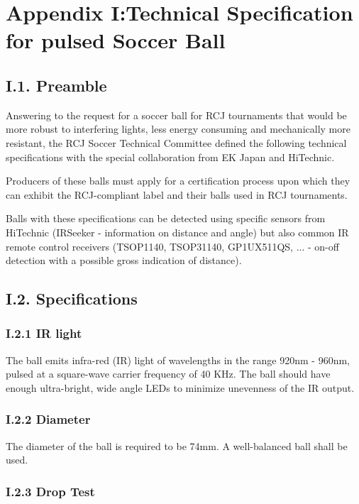 \documentclass{article}
\begin{document}
\section{Appendix I:Technical Specification for pulsed Soccer Ball\label{ref-062}}

\subsection{I.1. Preamble}

Answering to the request for a soccer ball for RCJ tournaments that would be more robust to interfering lights, less energy consuming and mechanically more resistant, the RCJ Soccer Technical Committee defined the following technical specifications with the special collaboration from EK Japan and HiTechnic.

Producers of these balls must apply for a certification process upon which they can exhibit the RCJ-compliant label and their balls used in RCJ tournaments.

Balls with these specifications can be detected using specific sensors from HiTechnic (IRSeeker - information on distance and angle) but also common IR remote control receivers (TSOP1140, TSOP31140, GP1UX511QS, ... - on-off detection with a possible gross indication of distance).

\subsection{I.2. Specifications}

\subsubsection{I.2.1 IR light}

The ball emits infra-red (IR) light of wavelengths in the range 920nm - 960nm, pulsed at a square-wave carrier frequency of 40 KHz. The ball should have enough ultra-bright, wide angle LEDs to minimize unevenness of the IR output.

\subsubsection{I.2.2 Diameter}

The diameter of the ball is required to be 74mm. A well-balanced ball shall be used.

\subsubsection{I.2.3 Drop Test}
\end{document}
